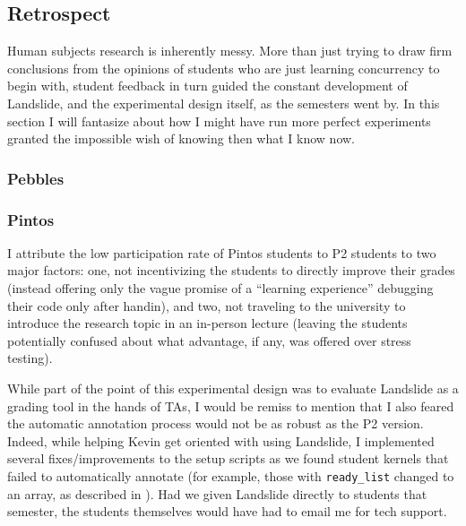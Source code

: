 

\subsection{Retrospect}

Human subjects research is inherently messy.
More than just trying to draw firm conclusions from
the opinions of students who are just learning concurrency to begin with,
student feedback in turn guided the constant development
of Landslide, and the experimental design itself,
as the semesters went by.
In this section I will fantasize about how I might have run more perfect experiments
granted the impossible wish of knowing then what I know now.

\subsubsection{Pebbles}


\subsubsection{Pintos}

I attribute the low participation rate of Pintos students to P2 students to two major factors:
one, not incentivizing the students to directly improve their grades
(instead offering only the vague promise of a ``learning experience'' debugging their code only after handin),
and two, not traveling to the university to introduce the research topic in an in-person lecture
(leaving the students potentially confused about what advantage, if any, was offered over stress testing).

While part of the point of this experimental design was to evaluate Landslide as a grading tool in the hands of TAs,
I would be remiss to mention that I also feared the automatic annotation process would not be as robust as the P2 version.
Indeed, while helping Kevin get oriented with using Landslide,
I implemented
several %
fixes/improvements to the setup scripts
as we found student kernels that failed to automatically annotate
(for example, those with {\tt ready\_list} changed to an array,
as described in \sect{\ref{sec:education-pintos-instrumentation}}).
Had we given Landslide directly to students that semester,
the students themselves would have had to email me for tech support.

